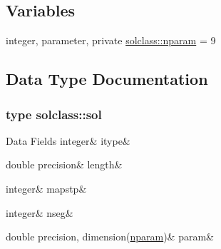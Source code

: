 \subsection*{Variables}
\begin{DoxyCompactItemize}
\item 
integer, parameter, private \mbox{\hyperlink{namespacesolclass_abb5af39a08a5ff2cbe713621b2727eaf}{solclass\+::nparam}} = 9
\end{DoxyCompactItemize}


\subsection{Data Type Documentation}
\label{structsolclass_1_1sol}
\subsubsection{type solclass\+::sol}
\begin{DoxyFields}{Data Fields}
\mbox{\label{namespacesolclass_ae34e01b972a2658f3ff55fccc3f6b99a}} 
integer&
itype&
\\
\hline

\mbox{\label{namespacesolclass_a66fe4253293f305d51d6d7db753bb2c2}} 
double precision&
length&
\\
\hline

\mbox{\label{namespacesolclass_a3821a5713cb3e0e9ae5359b42644b860}} 
integer&
mapstp&
\\
\hline

\mbox{\label{namespacesolclass_a4e0b71eae9d2072fd83b1a4e524da7fc}} 
integer&
nseg&
\\
\hline

\mbox{\label{namespacesolclass_a70efaac352dbf744000a92effd3d814b}} 
double precision, dimension(\mbox{\hyperlink{namespacesolclass_abb5af39a08a5ff2cbe713621b2727eaf}{nparam}})&
param&
\\
\hline

\end{DoxyFields}
